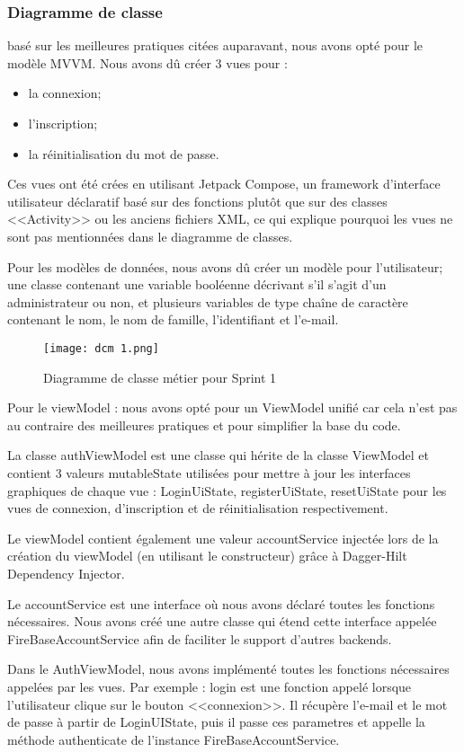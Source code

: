 \subsubsection{Diagramme de classe}
basé sur les meilleures pratiques citées auparavant, nous avons opté pour le modèle MVVM. Nous avons dû créer 3 vues pour : 
\begin{itemize}
  \item la connexion;
  \item l'inscription;
  \item la réinitialisation du mot de passe. 
\end{itemize}
Ces vues ont été crées en utilisant Jetpack Compose, un framework d'interface utilisateur déclaratif basé sur des fonctions plutôt que sur des classes <<Activity>> ou les anciens fichiers XML, ce qui explique pourquoi les vues ne sont pas mentionnées dans le diagramme de classes.

Pour les modèles de données, nous avons dû créer un modèle pour l'utilisateur; une classe contenant une variable booléenne décrivant s'il s'agit d'un administrateur ou non, et plusieurs variables de type chaîne de caractère contenant le nom, le nom de famille, l'identifiant et l'e-mail.
 \begin{figure}[htb!]
        \centering
        \texttt{[image: dcm 1.png]}
        \caption{Diagramme de classe métier pour Sprint 1}
    \end{figure}

Pour le viewModel : nous avons opté pour un ViewModel unifié car cela n'est pas au contraire des meilleures pratiques et pour simplifier la base du code.

La classe authViewModel est une classe qui hérite de la classe ViewModel et contient 3 valeurs mutableState utilisées pour mettre à jour les interfaces graphiques de chaque vue : LoginUiState, registerUiState, resetUiState pour les vues de connexion, d'inscription et de réinitialisation respectivement.

Le viewModel contient également une valeur accountService injectée lors de la création du viewModel (en utilisant le constructeur) grâce à Dagger-Hilt Dependency Injector.

Le accountService est une interface où nous avons déclaré toutes les fonctions nécessaires.
Nous avons créé une autre classe qui étend cette interface appelée FireBaseAccountService afin de faciliter le support d'autres backends.

Dans le AuthViewModel, nous avons implémenté toutes les fonctions nécessaires appelées par les vues. Par exemple : login est une fonction appelé lorsque l'utilisateur clique sur le bouton  <<connexion>>. Il récupère l'e-mail et le mot de passe à partir de LoginUIState, puis il passe ces parametres et appelle la méthode authenticate de l'instance FireBaseAccountService.

